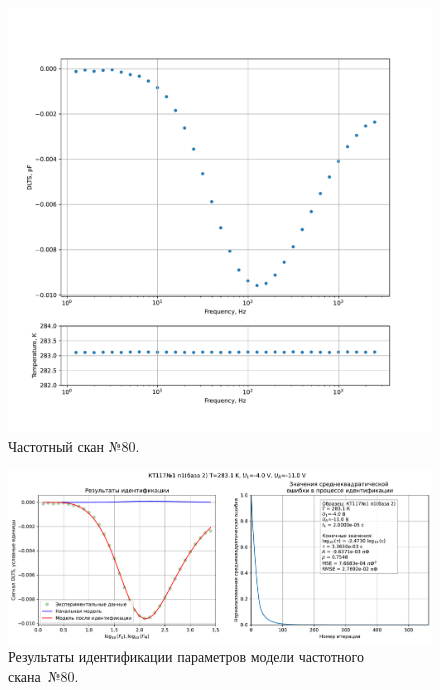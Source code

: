 \begin{figure}[!ht]
    \centering
    \includegraphics[width=1\textwidth]{../plots/КТ117№1_п1(база 2)_2500Гц-1Гц_1пФ_+10С_-4В-11В_200мВ_20мкс_шаг_0,1.pdf}
    \caption{Частотный скан №80.}
    \label{pic:frequency_scan_80}
\end{figure}

\begin{figure}[!ht]
    \centering
    \includegraphics[width=1\textwidth]{../plots/КТ117№1_п1(база 2)_2500Гц-1Гц_1пФ_+10С_-4В-11В_200мВ_20мкс_шаг_0,1_model.pdf}
    \caption{Результаты идентификации параметров модели частотного скана~№80.}
    \label{pic:frequency_scan_model80}
\end{figure}

\pagebreak


